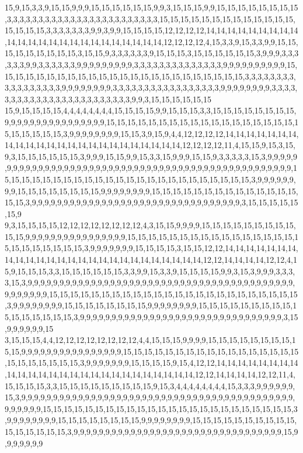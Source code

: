 15,9,15,3,3,9,15,15,9,9,9,15,15,15,15,15,15,9,9,3,15,15,15,9,9,15,15,15,15,15,15,15,15,3,3,3,3,3,3,3,3,3,3,3,3,3,3,3,3,3,3,3,3,3,3,3,3,15,15,15,15,15,15,15,15,15,15,15,15,15,15,15,15,15,3,3,3,3,3,3,3,9,9,3,9,9,15,15,15,15,12,12,12,12,14,14,14,14,14,14,14,14,14,14,14,14,14,14,14,14,14,14,14,14,14,14,14,14,12,12,12,12,4,15,3,3,9,15,3,3,9,9,15,15,15,15,15,15,15,15,15,3,15,15,9,3,3,3,3,3,3,9,15,15,15,3,15,15,15,15,15,15,3,9,9,9,3,3,3,3,3,3,9,9,3,3,3,3,3,3,9,9,9,9,9,9,9,9,9,3,3,3,3,3,3,3,3,3,3,3,3,3,3,9,9,9,9,9,9,9,9,9,9,15,15,15,15,15,15,15,15,15,15,15,15,15,15,15,15,15,15,15,15,15,15,15,15,3,3,3,3,3,3,3,3,3,3,3,3,3,3,3,3,3,9,9,9,9,9,9,9,9,3,3,3,3,3,3,3,3,3,3,3,3,3,3,3,3,3,9,9,9,9,9,9,9,9,3,3,3,3,3,3,3,3,3,3,3,3,3,3,3,3,3,3,3,3,3,3,3,3,9,9,3,15,15,15,15,15,15
15,9,15,15,15,15,4,4,4,4,4,4,4,4,15,15,15,15,9,9,15,15,15,3,3,15,15,15,15,15,15,15,15,9,9,9,9,9,9,9,9,9,9,9,9,9,9,9,9,15,15,15,15,15,15,15,15,15,15,15,15,15,15,15,15,15,15,15,15,15,15,15,15,3,9,9,9,9,9,9,9,9,15,15,3,9,15,9,4,4,12,12,12,12,14,14,14,14,14,14,14,14,14,14,14,14,14,14,14,14,14,14,14,14,14,14,14,14,12,12,12,12,11,4,15,15,9,15,3,15,9,3,15,15,15,15,15,15,3,9,9,9,15,15,9,9,15,3,3,15,9,9,9,15,15,9,3,3,3,3,3,15,3,9,9,9,9,9,9,9,9,9,9,9,9,9,9,9,9,9,9,9,9,9,9,9,9,9,9,9,9,9,9,9,9,9,9,9,9,9,9,9,9,9,9,9,9,9,9,9,9,9,9,15,15,15,15,15,15,15,15,15,15,15,15,15,15,15,15,15,15,15,15,15,15,15,15,3,9,9,9,9,9,9,9,9,15,15,15,15,15,15,15,15,9,9,9,9,9,9,9,9,15,15,15,15,15,15,15,15,15,15,15,15,15,15,15,15,3,9,9,9,9,9,9,9,9,9,9,9,9,9,9,9,9,9,9,9,9,9,9,9,9,9,9,9,9,9,9,9,9,9,3,15,15,15,15,15,15,9
9,3,15,15,15,15,12,12,12,12,12,12,12,12,4,3,15,15,9,9,9,9,15,15,15,15,15,15,15,15,15,15,15,9,9,9,9,9,9,9,9,9,9,9,9,9,9,9,9,15,15,15,15,15,15,15,15,15,15,15,15,15,15,15,15,15,15,15,15,15,15,15,15,3,9,9,9,9,9,9,9,15,15,15,15,3,15,15,12,12,14,14,14,14,14,14,14,14,14,14,14,14,14,14,14,14,14,14,14,14,14,14,14,14,14,14,12,12,14,14,14,14,12,12,4,15,9,15,15,15,3,3,15,15,15,15,15,15,3,3,9,9,15,3,3,9,15,15,15,15,9,9,3,15,3,9,9,9,3,3,3,3,15,3,9,9,9,9,9,9,9,9,9,9,9,9,9,9,9,9,9,9,9,9,9,9,9,9,9,9,9,9,9,9,9,9,9,9,9,9,9,9,9,9,9,9,9,9,9,9,9,9,9,15,15,15,15,15,15,15,15,15,15,15,15,15,15,15,15,15,15,15,15,15,15,15,15,3,9,9,9,9,9,9,9,9,15,15,15,15,15,15,15,15,9,9,9,9,9,9,9,9,15,15,15,15,15,15,15,15,15,15,15,15,15,15,15,15,3,9,9,9,9,9,9,9,9,9,9,9,9,9,9,9,9,9,9,9,9,9,9,9,9,9,9,9,9,9,9,9,9,3,15,9,9,9,9,9,9,15
3,15,15,15,4,4,12,12,12,12,12,12,12,12,4,4,15,15,15,9,9,9,9,15,15,15,15,15,15,15,15,15,15,9,9,9,9,9,9,9,9,9,9,9,9,9,9,9,9,15,15,15,15,15,15,15,15,15,15,15,15,15,15,15,15,15,15,15,15,15,15,15,15,3,9,9,9,9,9,9,9,15,15,15,15,9,15,4,12,12,14,14,14,14,14,14,14,14,14,14,14,14,14,14,14,14,14,14,14,14,14,14,14,14,14,14,12,12,14,14,14,14,12,12,11,4,15,15,15,15,3,3,15,15,15,15,15,15,15,15,15,9,15,3,4,4,4,4,4,4,4,4,15,3,3,3,9,9,9,9,9,9,15,3,9,9,9,9,9,9,9,9,9,9,9,9,9,9,9,9,9,9,9,9,9,9,9,9,9,9,9,9,9,9,9,9,9,9,9,9,9,9,9,9,9,9,9,9,9,9,9,9,9,15,15,15,15,15,15,15,15,15,15,15,15,15,15,15,15,15,15,15,15,15,15,15,15,3,9,9,9,9,9,9,9,9,15,15,15,15,15,15,15,15,9,9,9,9,9,9,9,9,15,15,15,15,15,15,15,15,15,15,15,15,15,15,15,15,3,9,9,9,9,9,9,9,9,9,9,9,9,9,9,9,9,9,9,9,9,9,9,9,9,9,9,9,9,9,9,9,9,9,15,9,9,9,9,9,9,9
